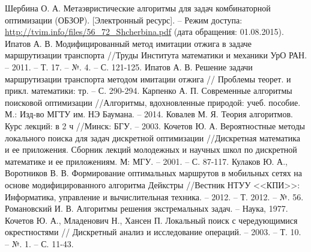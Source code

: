 \begin{thebibliography}{10}
     Шербина О. А. Метаэвристические алгоритмы для задач комбинаторной оптимизации (ОБЗОР).
        [Электронный ресурс]. -- Режим доступа: \url{http://tvim.info/files/56_72_Shcherbina.pdf} 
        (дата обращения: 01.08.2015).
     Ипатов А. В. Модифицированный метод имитации отжига в задаче маршрутизации 
        транспорта //Труды Института математики и механики УрО РАН. -- 2011. -- Т. 17. -- №. 4. -- С. 121-125.
     Ипатов А. В. Решение задачи маршрутизации транспорта методом имитации отжига //
        Проблемы теорет. и прикл. математики: тр. -- С. 290-294.
     Карпенко А. П. Современные алгоритмы поисковой оптимизации //Алгоритмы, 
        вдохновленные природой: учеб. пособие. М.: Изд-во МГТУ им. НЭ Баумана. -- 2014.
     Ковалев М. Я. Теория алгоритмов. Курс лекций: в 2 ч //Минск: БГУ. -- 2003.
     Кочетов Ю. А. Вероятностные методы локального поиска для задач дискретной 
        оптимизации //Дискретная математика и ее приложения. Сборник лекций молодежных и научных школ 
        по дискретной математике и ее приложениям. М: МГУ. -- 2001. -- С. 87-117.
     Кулаков Ю. А., Воротников В. В. Формирование оптимальных маршрутов в мобильных сетях 
        на основе модифицированного алгоритма Дейкстры //Вестник НТУУ <<КПИ>>: Информатика, управление 
        и вычислительная техника. -- 2012. -- Т. 2012. -- №. 56.
     Романовский И. В. Алгоритмы решения экстремальных задач. -- Наука, 1977.
     Кочетов Ю. А., Младенович Н., Хансен П. Локальный поиск с чередующимися окрестностями //
        Дискретный анализ и исследование операций. -- 2003. -- Т. 10. -- №. 1. -- С. 11-43.

\end{thebibliography}

\pagestyle{plain}